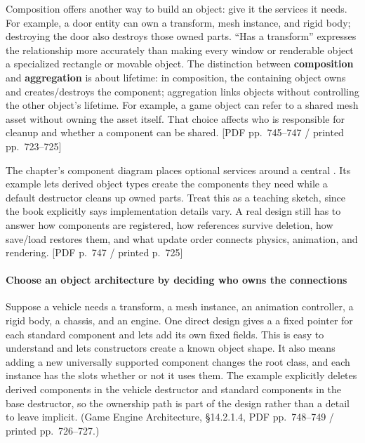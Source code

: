 Composition offers another way to build an object: give it the services it needs. For example, a door entity can own a transform, mesh instance, and rigid body; destroying the door also destroys those owned parts. ``Has a transform'' expresses the relationship more accurately than making every window or renderable object a specialized rectangle or movable object. The distinction between \textbf{composition} and \textbf{aggregation} is about lifetime: in composition, the containing object owns and creates/destroys the component; aggregation links objects without controlling the other object's lifetime. For example, a game object can refer to a shared mesh asset without owning the asset itself. That choice affects who is responsible for cleanup and whether a component can be shared. {[}PDF pp.~745--747 / printed pp.~723--725{]}

The chapter's component diagram places optional services around a central . Its example lets derived object types create the components they need while a default destructor cleans up owned parts. Treat this as a teaching sketch, since the book explicitly says implementation details vary. A real design still has to answer how components are registered, how references survive deletion, how save/load restores them, and what update order connects physics, animation, and rendering. {[}PDF p.~747 / printed p.~725{]}

\paragraph{Choose an object architecture by deciding who owns the connections}\label{06-engine-ii-ch041-choose-an-object-architecture-by-deciding-who-owns-the-connections}

\hypertarget{06-engine-ii-ch041-choose-an-object-architecture-by-deciding-who-owns-the-connections}{}

Suppose a vehicle needs a transform, a mesh instance, an animation controller, a rigid body, a chassis, and an engine. One direct design gives a  a fixed pointer for each standard component and lets  add its own fixed fields. This is easy to understand and lets constructors create a known object shape. It also means adding a new universally supported component changes the root class, and each instance has the slots whether or not it uses them. The example explicitly deletes derived components in the vehicle destructor and standard components in the base destructor, so the ownership path is part of the design rather than a detail to leave implicit. (Game Engine Architecture, §14.2.1.4, PDF pp.~748--749 / printed pp.~726--727.)

